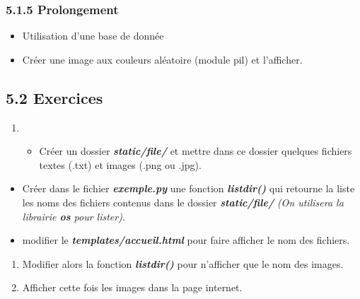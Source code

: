 \documentclass{article}
\begin{document}
\subsubsection{5.1.5 Prolongement}\label{prolongement}

\begin{itemize}
\itemsep1pt\parskip0pt
\item
  Utilisation d'une base de donnée
\item
  Créer une image aux couleurs aléatoire (module pil) et l'afficher.
\end{itemize}

\subsection{5.2 Exercices}\label{exercices}

\begin{enumerate}
\def\labelenumi{\arabic{enumi}.}
\item
  \begin{itemize}
  \itemsep1pt\parskip0pt
  \item
    Créer un dossier \textbf{\emph{static/file/}} et mettre dans ce
    dossier quelques fichiers textes (.txt) et images (.png ou .jpg).\\
  \end{itemize}
\end{enumerate}

\begin{itemize}
\itemsep1pt\parskip0pt
\item
  Créer dans le fichier \textbf{\emph{exemple.py}} une fonction
  \textbf{\emph{listdir()}} qui retourne la liste les noms des fichiers
  contenus dans le dossier \textbf{\emph{static/file/}} \emph{(On
  utilisera la librairie \textbf{os} pour lister)}.
\item
  modifier le \textbf{\emph{templates/accueil.html}} pour faire afficher
  le nom des fichiers.
\end{itemize}

\begin{enumerate}
\def\labelenumi{\arabic{enumi}.}
\setcounter{enumi}{1}
\itemsep1pt\parskip0pt
\item
  Modifier alors la fonction \textbf{\emph{listdir()}} pour n'afficher
  que le nom des images.
\item
  Afficher cette fois les images dans la page internet.
\end{enumerate}


    
    
    
    
\end{document}
